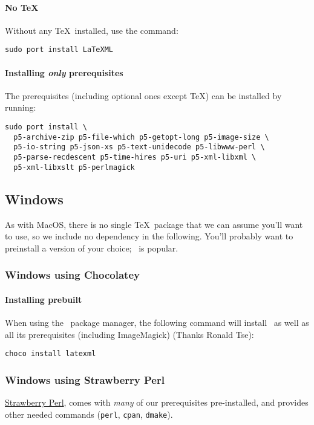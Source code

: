 \documentclass{article}
\begin{document}
\paragraph*{No \TeX}
Without any \TeX\ installed, use the command:
\begin{lstlisting}[style=shell]
sudo port install LaTeXML
\end{lstlisting}

\paragraph*{Installing \emph{only} prerequisites}\label{get.macos.macports.prereq}
The prerequisites (including optional ones except \TeX) can be installed by running:
\begin{lstlisting}[style=shell]
sudo port install \
  p5-archive-zip p5-file-which p5-getopt-long p5-image-size \
  p5-io-string p5-json-xs p5-text-unidecode p5-libwww-perl \
  p5-parse-recdescent p5-time-hires p5-uri p5-xml-libxml \
  p5-xml-libxslt p5-perlmagick
\end{lstlisting}

\subsection{Windows}\label{get.windows}\index{windows}
As with MacOS, there is no single \TeX\ package that we can assume
you'll want to use, so we include no dependency in the following.
You'll probably want to preinstall a version of your choice;
\MikTeX\ is popular.

\subsubsection{Windows using Chocolatey}\label{get.windows.chocolatey}
\paragraph*{Installing prebuilt}
When using the \Chocolatey\ package manager,
the following command will install \LaTeXML\ as well as all
its prerequisites (including ImageMagick)
(Thanks Ronald Tse):
\begin{lstlisting}[style=shell]
choco install latexml
\end{lstlisting}

\subsubsection{Windows using Strawberry Perl}\label{get.windows.strawberry}
\href{http://strawberryperl.com}{Strawberry Perl},
comes with \emph{many} of our prerequisites pre-installed,
and provides other needed commands (\texttt{perl}, \texttt{cpan}, \texttt{dmake}).
\end{document}

